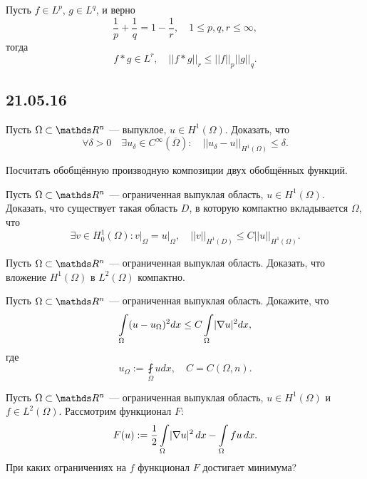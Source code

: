 \begin{exercise}
Пусть $f \in L^p$, $g \in L^q$, и верно
$$\frac {1} {p} + \frac {1} {q} = 1 - \frac {1} {r}, \quad 1 \leq p,q,r \leq \infty, $$
тогда
$$f * g \in L^r, \quad || f*g ||_r \leq || f ||_p || g ||_q. $$
\end{exercise}

\subsection*{21.05.16}
\begin{exercise}
Пусть $\Omega \subset \real^n$ --- выпуклое, $u \in H^1(\Omega)$. Доказать, что
$$\forall \delta > 0 \quad \exists u_{\delta} \in C^{\infty} (\overline{\Omega}):\quad ||u_{\delta} - u ||_{H^1(\Omega)} \leq \delta. $$
\end{exercise}

\begin{exercise}
Посчитать обобщённую производную композиции двух обобщённых функций.
\end{exercise}

\begin{exercise}
Пусть $\Omega \subset \real^n$ --- ограниченная выпуклая область, $u \in H^1(\Omega)$. Доказать, что существует такая область $D$, в которую компактно вкладывается $\Omega$, что
$$\exists v \in H_0^1(\Omega): v\Big\rvert_{\Omega} = u\Big\rvert_{\Omega}, \quad || v ||_{H^1(D)} \leq C || u ||_{H^1(\Omega)}.$$
\end{exercise}

\begin{exercise}
Пусть $\Omega \subset \real^n$ --- ограниченная выпуклая область. Доказать, что вложение $H^1(\Omega)$ в $L^2 (\Omega)$ компактно.
\end{exercise}

\begin{exercise}
Пусть $\Omega \subset \real^n$ --- ограниченная выпуклая область. Докажите, что
$$ \int \limits_{\Omega} (u - u_{\Omega})^2 dx \leq C \int \limits_{\Omega} \lvert\nabla u\rvert^2 dx, $$
где
$$ u_{\Omega} := \fint \limits_{\Omega} u dx, \quad C = C(\Omega,n).$$
\end{exercise}

\begin{exercise}
Пусть $\Omega \subset \real^n$ --- ограниченная выпуклая область, $u \in H^1(\Omega)$ и $f \in L^2(\Omega)$. Рассмотрим функционал $F$:
$$ F(u) := \frac {1} {2} \int \limits_{\Omega} \lvert\nabla u\rvert^2 \, dx - \int \limits_{\Omega} fu \, dx.$$
При каких ограничениях на $f$ функционал $F$ достигает минимума? 
\end{exercise}